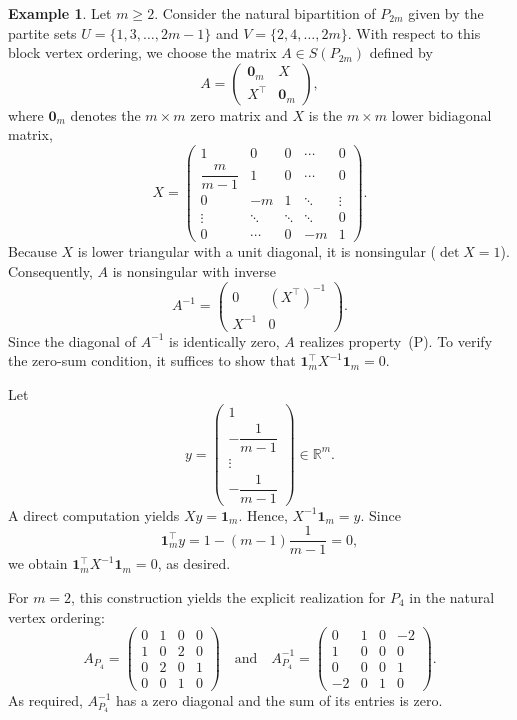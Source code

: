 \documentclass[12pt,reqno]{amsart}
\theoremstyle{definition}
\newtheorem{example}[thm]{Example}
\numberwithin{equation}{subsection}
\numberwithin{equation}{section}
\def\det{\operatorname{det}}
\begin{document}
\begin{example}
Let \(m\ge2\).
Consider the natural bipartition of $P_{2m}$ given by the partite sets $U=\{1,3,\dots,2m-1\}$ and $V=\{2,4,\dots,2m\}$. With respect to this block vertex ordering, we choose the matrix $A \in S(P_{2m})$ defined by
\[
A=
\begin{pmatrix}
\mathbf0_m&X\\[2mm]
X^\top&\mathbf0_m
\end{pmatrix},
\]
where \(\mathbf0_m\) denotes the \(m\times m\) zero matrix and $X$ is the $m \times m$ lower bidiagonal matrix,
\[
X=
\begin{pmatrix}
1&0&0&\cdots&0\\[2mm]
\dfrac{m}{m-1}&1&0&\cdots&0\\[2mm]
0&-m&1&\ddots&\vdots\\
\vdots&\ddots&\ddots&\ddots&0\\
0&\cdots&0&-m&1
\end{pmatrix}.
\]
Because $X$ is lower triangular with a unit diagonal, it is nonsingular ($\det X = 1$). Consequently, $A$ is nonsingular with inverse
\[
A^{-1}=
\begin{pmatrix}
0&{(X^{\top})}^{-1}\\
X^{-1}&0
\end{pmatrix}.
\]
Since the diagonal of $A^{-1}$ is identically zero, $A$ realizes property~(P). To verify the zero-sum condition, it suffices to show that $\mathbf1_m^\top X^{-1}\mathbf1_m=0$. 

Let
\[
y=
\begin{pmatrix}
1\\[1mm]
-\dfrac{1}{m-1}\\
\vdots\\
-\dfrac{1}{m-1}
\end{pmatrix} \in \mathbb{R}^m.
\]
A direct computation yields $Xy=\mathbf1_m.$ Hence, $X^{-1}\mathbf1_m=y$. Since
\[
\mathbf1_m^\top y
=
1-(m-1)\frac1{m-1}
=0,
\]
we obtain $\mathbf1_m^\top X^{-1}\mathbf1_m=0$, as desired.

For $m=2$, this construction yields the explicit realization for $P_4$ in the natural vertex ordering:
\[
A_{P_4} = 
\begin{pmatrix}
0&1&0&0\\
1&0&2&0\\
0&2&0&1\\
0&0&1&0
\end{pmatrix}
\quad \text{and} \quad
A_{P_4}^{-1} = 
\begin{pmatrix}
0&1&0&-2\\
1&0&0&0\\
0&0&0&1\\
-2&0&1&0
\end{pmatrix}.
\]
As required, $A_{P_4}^{-1}$ has a zero diagonal and the sum of its entries is zero.
\end{example}
\end{document}

